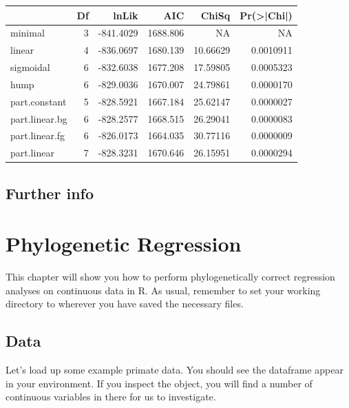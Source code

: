 \documentclass[
]{book}
\begin{document}
\begin{tabular}{l|r|r|r|r|r}
\hline
  & Df & lnLik & AIC & ChiSq & Pr(>|Chi|)\\
\hline
minimal & 3 & -841.4029 & 1688.806 & NA & NA\\
\hline
linear & 4 & -836.0697 & 1680.139 & 10.66629 & 0.0010911\\
\hline
sigmoidal & 6 & -832.6038 & 1677.208 & 17.59805 & 0.0005323\\
\hline
hump & 6 & -829.0036 & 1670.007 & 24.79861 & 0.0000170\\
\hline
part.constant & 5 & -828.5921 & 1667.184 & 25.62147 & 0.0000027\\
\hline
part.linear.bg & 6 & -828.2577 & 1668.515 & 26.29041 & 0.0000083\\
\hline
part.linear.fg & 6 & -826.0173 & 1664.035 & 30.77116 & 0.0000009\\
\hline
part.linear & 7 & -828.3231 & 1670.646 & 26.15951 & 0.0000294\\
\hline
\end{tabular}

\hypertarget{section}{%
\section{}\label{section}}

\hypertarget{further-info-5}{%
\section{Further info}\label{further-info-5}}

\hypertarget{w2PGLS}{%
\chapter{Phylogenetic Regression}\label{w2PGLS}}

This chapter will show you how to perform phylogenetically correct regression analyses on continuous data in R. As usual, remember to set your working directory to wherever you have saved the necessary files.

\hypertarget{data-3}{%
\section{Data}\label{data-3}}

Let's load up some example primate data. You should see the dataframe appear in your environment. If you inspect the object, you will find a number of continuous variables in there for us to investigate.
\end{document}
